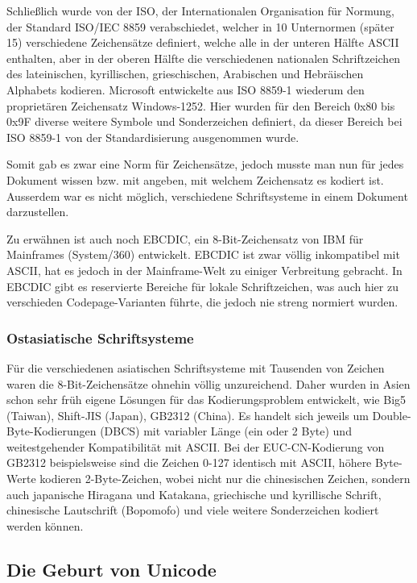 Schließlich wurde von der ISO, der Internationalen Organisation für Normung, der Standard ISO/IEC 8859 verabschiedet, welcher in 10 Unternormen (später 15) verschiedene Zeichensätze definiert, welche alle in der unteren Hälfte ASCII enthalten, aber in der oberen Hälfte die verschiedenen nationalen Schriftzeichen des lateinischen, kyrillischen, grieschischen, Arabischen und Hebräischen Alphabets kodieren.
Microsoft entwickelte aus ISO 8859-1 wiederum den proprietären Zeichensatz Windows-1252. Hier wurden für den Bereich 0x80 bis 0x9F diverse weitere Symbole und Sonderzeichen definiert, da dieser Bereich bei ISO 8859-1 von der Standardisierung ausgenommen wurde.

Somit gab es zwar eine Norm für Zeichensätze, jedoch musste man nun für jedes Dokument wissen bzw. mit angeben, mit welchem Zeichensatz es kodiert ist. Ausserdem war es nicht möglich, verschiedene Schriftsysteme in einem Dokument darzustellen. 

Zu erwähnen ist auch noch EBCDIC, ein 8-Bit-Zeichensatz von IBM für Mainframes (System/360) entwickelt. EBCDIC ist zwar völlig inkompatibel mit ASCII, hat es jedoch in der Mainframe-Welt zu einiger Verbreitung gebracht. In EBCDIC gibt es reservierte Bereiche für lokale Schriftzeichen, was auch hier zu verschieden Codepage-Varianten führte, die jedoch nie streng normiert wurden.

\subsubsection{Ostasiatische Schriftsysteme}
Für die verschiedenen asiatischen Schriftsysteme mit Tausenden von Zeichen waren die 8-Bit-Zeichensätze ohnehin völlig unzureichend. Daher wurden in Asien schon sehr früh eigene Lösungen für das Kodierungsproblem entwickelt, wie Big5 (Taiwan), Shift-JIS (Japan), GB2312 (China). Es handelt sich jeweils um Double-Byte-Kodierungen (DBCS) mit variabler Länge (ein oder 2 Byte) und weitestgehender Kompatibilität mit ASCII. Bei der EUC-CN-Kodierung von GB2312 beispielsweise sind die Zeichen 0-127 identisch mit ASCII, höhere Byte-Werte kodieren 2-Byte-Zeichen, wobei nicht nur die chinesischen Zeichen, sondern auch japanische Hiragana und Katakana, griechische und kyrillische Schrift, chinesische Lautschrift (Bopomofo) und viele weitere Sonderzeichen kodiert werden können. 

\subsection{Die Geburt von Unicode}
